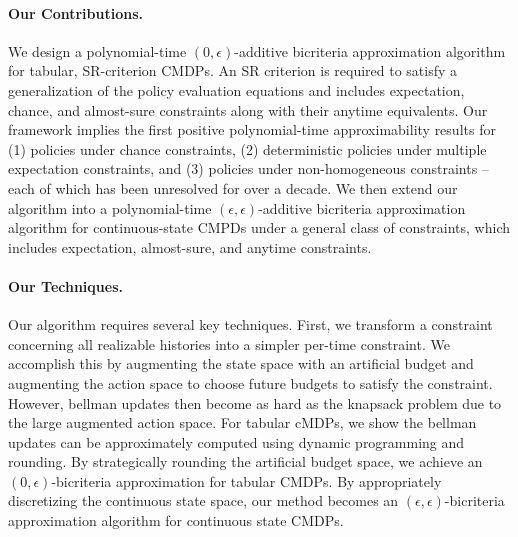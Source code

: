 \documentclass[pdftex, a4paper, 12pt]{article}
\newcommand{\jeremy}[1]{\textcolor{red}{#1}}
\begin{document}
\paragraph{Our Contributions.} We design a polynomial-time $(0,\epsilon)$-additive bicriteria approximation algorithm for tabular, SR-criterion CMDPs. An SR criterion is required to satisfy a generalization of the policy evaluation equations and includes expectation, chance, and almost-sure constraints along with their anytime equivalents. Our framework implies the first positive polynomial-time approximability results for (1) policies under chance constraints, (2) deterministic policies under multiple expectation constraints, and (3) policies under non-homogeneous constraints -- each of which has been unresolved for over a decade. We then extend our algorithm into a polynomial-time $(\epsilon,\epsilon)$-additive bicriteria approximation algorithm for continuous-state CMPDs under a general class of constraints, which includes expectation, almost-sure, and anytime constraints.  


\paragraph{Our Techniques.} Our algorithm requires several key techniques. First, we transform a constraint concerning all realizable histories into a simpler per-time constraint. We accomplish this by augmenting the state space with an artificial budget and augmenting the action space to choose future budgets to satisfy the constraint. However, bellman updates then become as hard as the knapsack problem due to the large augmented action space. For tabular cMDPs, we show the bellman updates can be approximately computed using dynamic programming and rounding. By strategically rounding the artificial budget space, we achieve an $(0,\epsilon)$-bicriteria approximation for tabular CMDPs. By appropriately discretizing the continuous state space, our method becomes an $(\epsilon,\epsilon)$-bicriteria approximation algorithm for continuous state CMDPs. 
\end{document}
